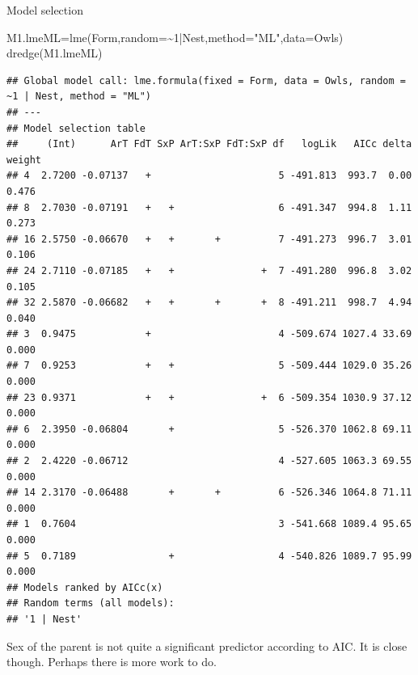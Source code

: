 \documentclass[
  ignorenonframetext,
]{beamer}
\newenvironment{Shaded}{\begin{snugshade}}{\end{snugshade}}
\newcommand{\AttributeTok}[1]{\textcolor[rgb]{0.77,0.63,0.00}{#1}}
\newcommand{\DecValTok}[1]{\textcolor[rgb]{0.00,0.00,0.81}{#1}}
\newcommand{\FunctionTok}[1]{\textcolor[rgb]{0.00,0.00,0.00}{#1}}
\newcommand{\NormalTok}[1]{#1}
\newcommand{\OtherTok}[1]{\textcolor[rgb]{0.56,0.35,0.01}{#1}}
\newcommand{\SpecialCharTok}[1]{\textcolor[rgb]{0.00,0.00,0.00}{#1}}
\newcommand{\StringTok}[1]{\textcolor[rgb]{0.31,0.60,0.02}{#1}}
\begin{document}
\begin{frame}[fragile]{Model selection}
\protect\hypertarget{model-selection}{}
\tiny

\begin{Shaded}
\begin{Highlighting}[]
\NormalTok{M1.lmeML}\OtherTok{=}\FunctionTok{lme}\NormalTok{(Form,}\AttributeTok{random=}\SpecialCharTok{\textasciitilde{}}\DecValTok{1}\SpecialCharTok{|}\NormalTok{Nest,}\AttributeTok{method=}\StringTok{"ML"}\NormalTok{,}\AttributeTok{data=}\NormalTok{Owls)}
\FunctionTok{dredge}\NormalTok{(M1.lmeML)}
\end{Highlighting}
\end{Shaded}

\begin{verbatim}
## Global model call: lme.formula(fixed = Form, data = Owls, random = ~1 | Nest, method = "ML")
## ---
## Model selection table 
##     (Int)      ArT FdT SxP ArT:SxP FdT:SxP df   logLik   AICc delta weight
## 4  2.7200 -0.07137   +                      5 -491.813  993.7  0.00  0.476
## 8  2.7030 -0.07191   +   +                  6 -491.347  994.8  1.11  0.273
## 16 2.5750 -0.06670   +   +       +          7 -491.273  996.7  3.01  0.106
## 24 2.7110 -0.07185   +   +               +  7 -491.280  996.8  3.02  0.105
## 32 2.5870 -0.06682   +   +       +       +  8 -491.211  998.7  4.94  0.040
## 3  0.9475            +                      4 -509.674 1027.4 33.69  0.000
## 7  0.9253            +   +                  5 -509.444 1029.0 35.26  0.000
## 23 0.9371            +   +               +  6 -509.354 1030.9 37.12  0.000
## 6  2.3950 -0.06804       +                  5 -526.370 1062.8 69.11  0.000
## 2  2.4220 -0.06712                          4 -527.605 1063.3 69.55  0.000
## 14 2.3170 -0.06488       +       +          6 -526.346 1064.8 71.11  0.000
## 1  0.7604                                   3 -541.668 1089.4 95.65  0.000
## 5  0.7189                +                  4 -540.826 1089.7 95.99  0.000
## Models ranked by AICc(x) 
## Random terms (all models): 
## '1 | Nest'
\end{verbatim}

\normalsize

Sex of the parent is not quite a significant predictor according to AIC.
It is close though. Perhaps there is more work to do.
\end{frame}
\end{document}
